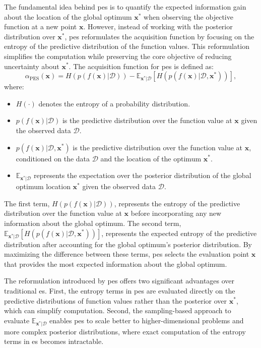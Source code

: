 The fundamental idea behind \ac{pes} is to quantify the expected information gain about the location of the global optimum $\mathbf{x}^*$ when observing the objective function at a new point $\mathbf{x}$. However, instead of working with the posterior distribution over $\mathbf{x}^*$, \ac{pes} reformulates the acquisition function by focusing on the entropy of the predictive distribution of the function values. This reformulation simplifies the computation while preserving the core objective of reducing uncertainty about $\mathbf{x}^*$. The acquisition function for \ac{pes} is defined as:
\begin{equation}
    \alpha_{\text{PES}}(\mathbf{x}) = H(p(f(\mathbf{x})|\mathcal{D})) - \mathbb{E}_{\mathbf{x}^*|\mathcal{D}} \left[ H(p(f(\mathbf{x})|\mathcal{D}, \mathbf{x}^*)) \right],
\end{equation}
where:
\begin{itemize}
    \item $H(\cdot)$ denotes the entropy of a probability distribution.
    \item $p(f(\mathbf{x})|\mathcal{D})$ is the predictive distribution over the function value at $\mathbf{x}$ given the observed data $\mathcal{D}$.
    \item $p(f(\mathbf{x})|\mathcal{D}, \mathbf{x}^*)$ is the predictive distribution over the function value at $\mathbf{x}$, conditioned on the data $\mathcal{D}$ and the location of the optimum $\mathbf{x}^*$.
    \item $\mathbb{E}_{\mathbf{x}^*|\mathcal{D}}$ represents the expectation over the posterior distribution of the global optimum location $\mathbf{x}^*$ given the observed data $\mathcal{D}$.
\end{itemize}

The first term, $H(p(f(\mathbf{x})|\mathcal{D}))$, represents the entropy of the predictive distribution over the function value at $\mathbf{x}$ before incorporating any new information about the global optimum. The second term, $\mathbb{E}_{\mathbf{x}^*|\mathcal{D}} \left[ H(p(f(\mathbf{x})|\mathcal{D}, \mathbf{x}^*)) \right]$, represents the expected entropy of the predictive distribution after accounting for the global optimum's posterior distribution. By maximizing the difference between these terms, \ac{pes} selects the evaluation point $\mathbf{x}$ that provides the most expected information about the global optimum.

The reformulation introduced by \ac{pes} offers two significant advantages over traditional \ac{es}. First, the entropy terms in \ac{pes} are evaluated directly on the predictive distributions of function values rather than the posterior over $\mathbf{x}^*$, which can simplify computation. Second, the sampling-based approach to evaluate $\mathbb{E}_{\mathbf{x}^*|\mathcal{D}}$ enables \ac{pes} to scale better to higher-dimensional problems and more complex posterior distributions, where exact computation of the entropy terms in \ac{es} becomes intractable.

